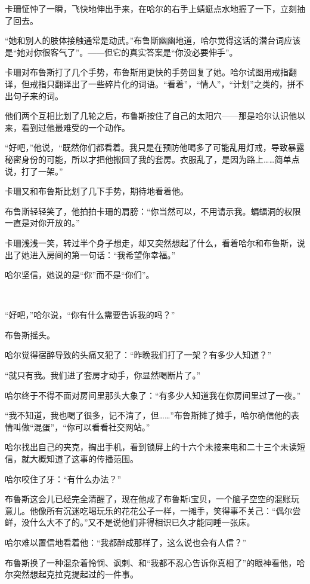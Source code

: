 \documentclass[../main.tex]{subfiles}
\begin{document}
卡珊怔忡了一瞬，飞快地伸出手来，在哈尔的右手上蜻蜓点水地握了一下，立刻抽了回去。

“她和别人的肢体接触通常是动武。”布鲁斯幽幽地道，哈尔觉得这话的潜台词应该是“她对你很客气了”。——但它的真实答案是“你没必要伸手”。

卡珊对布鲁斯打了几个手势，布鲁斯用更快的手势回复了她。哈尔试图用戒指翻译，但戒指只翻译出了一些碎片化的词语。“看着”，“情人”，“计划”之类的，拼不出句子来的词。

他们两个互相比划了几轮之后，布鲁斯按住了自己的太阳穴——那是哈尔认识他以来，看到过他最难受的一个动作。

“好吧，”他说，“既然你们都看着。我只是在预防他喝多了可能乱用灯戒，导致暴露秘密身份的可能，所以才把他搬回了我的套房。衣服乱了，是因为路上……简单点说，打了一架。”

卡珊又和布鲁斯比划了几下手势，期待地看着他。

布鲁斯轻轻笑了，他拍拍卡珊的肩膀：“你当然可以，不用请示我。蝙蝠洞的权限一直是对你开放的。”

卡珊浅浅一笑，转过半个身子想走，却又突然想起了什么，看着哈尔和布鲁斯，说出了她进入房间的第一句话：“我希望你幸福。”

哈尔坚信，她说的是“你”而不是“你们”。

~\

“好吧，”哈尔说，“你有什么需要告诉我的吗？”

布鲁斯摇头。

哈尔觉得宿醉导致的头痛又犯了：“昨晚我们打了一架？有多少人知道？”

“就只有我。我们进了套房才动手，你显然喝断片了。”

哈尔终于不得不面对房间里那头大象了：“有多少人知道我在你房间里过了一夜。”

“我不知道，我也喝了很多，记不清了，但……”布鲁斯摊了摊手，哈尔确信他的表情叫做“混蛋”，“你可以看看社交网站。”

哈尔找出自己的夹克，掏出手机，看到锁屏上的十六个未接来电和二十三个未读短信，就大概知道了这事的传播范围。

哈尔咬住了牙：“有什么办法？”

布鲁斯这会儿已经完全清醒了，现在他成了布鲁斯i宝贝，一个脑子空空的混账玩意儿。他像所有沉迷吃喝玩乐的花花公子一样，一摊手，笑得事不关己：“偶尔尝鲜，没什么大不了的。”又不是说他们非得相识已久才能同睡一张床。

哈尔难以置信地看着他：“我都醉成那样了，这么说也会有人信？”

布鲁斯换了一种混杂着怜悯、讽刺、和“我都不忍心告诉你真相了”的眼神看他，哈尔突然想起克拉克提起过的一件事。
\end{document}
